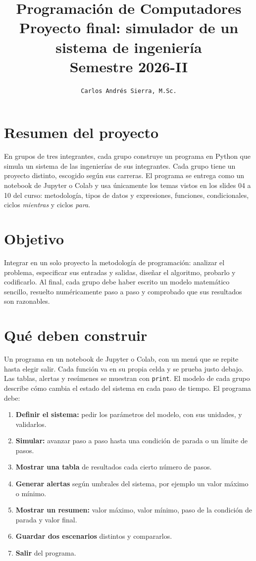 \documentclass[doc]{apa6}
\title{Programación de Computadores \\ Proyecto final: simulador de un sistema de ingeniería \\ Semestre 2026-II}
\author{\texttt{Carlos Andrés Sierra, M.Sc.}}
\affiliation{Departamento de Ingeniería de Sistemas y Computación \\ Facultad de Ingeniería \\ Universidad Nacional de Colombia}
\begin{document}
\maketitle

\section*{Resumen del proyecto}
En grupos de tres integrantes, cada grupo construye un programa en Python que simula un sistema de las ingenierías de sus integrantes. Cada grupo tiene un proyecto distinto, escogido según sus carreras. El programa se entrega como un notebook de Jupyter o Colab y usa únicamente los temas vistos en los slides 04 a 10 del curso: metodología, tipos de datos y expresiones, funciones, condicionales, ciclos \emph{mientras} y ciclos \emph{para}.

\section*{Objetivo}
Integrar en un solo proyecto la metodología de programación: analizar el problema, especificar sus entradas y salidas, diseñar el algoritmo, probarlo y codificarlo. Al final, cada grupo debe haber escrito un modelo matemático sencillo, resuelto numéricamente paso a paso y comprobado que sus resultados son razonables.

\section*{Qué deben construir}
Un programa en un notebook de Jupyter o Colab, con un menú que se repite hasta elegir salir. Cada función va en su propia celda y se prueba justo debajo. Las tablas, alertas y resúmenes se muestran con \texttt{print}. El modelo de cada grupo describe cómo cambia el estado del sistema en cada paso de tiempo. El programa debe:
\begin{enumerate}
    \item \textbf{Definir el sistema:} pedir los parámetros del modelo, con sus unidades, y validarlos.
    \item \textbf{Simular:} avanzar paso a paso hasta una condición de parada o un límite de pasos.
    \item \textbf{Mostrar una tabla} de resultados cada cierto número de pasos.
    \item \textbf{Generar alertas} según umbrales del sistema, por ejemplo un valor máximo o mínimo.
    \item \textbf{Mostrar un resumen:} valor máximo, valor mínimo, paso de la condición de parada y valor final.
    \item \textbf{Guardar dos escenarios} distintos y compararlos.
    \item \textbf{Salir} del programa.
\end{enumerate}
\end{document}
